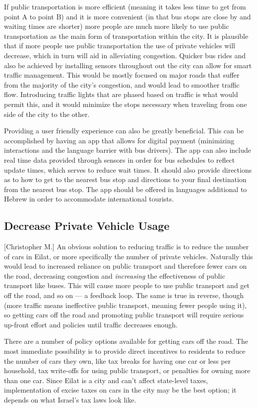 \documentclass[12pt]{article}                               %
\begin{document}
If public transportation is more efficient (meaning it takes less time to get from point A to point B) and it is more convenient (in that bus stops are close by and waiting times are shorter) more people are much more likely to use public transportation as the main form of transportation within the city. It is plausible that if more people use public transportation the use of private vehicles will decrease, which in turn will aid in alleviating congestion. Quicker bus rides and also be achieved by installing sensors throughout out the city can allow for smart traffic management. This would be mostly focused on major roads that suffer from the majority of the city's congestion, and would lead to smoother traffic flow. Introducing traffic lights that are phased based on traffic is what would permit this, and it would minimize the stops necessary when traveling from one side of the city to the other.

Providing a user friendly experience can also be greatly beneficial. This can be accomplished by having an app that allows for digital payment (minimizing interactions and the language barrier with bus drivers). The app can also include real time data provided through sensors in order for bus schedules to reflect update times, which serves to reduce wait times. It should also provide directions as to how to get to the nearest bus stop and directions to your final destination from the nearest bus stop. The app should be offered in languages additional to Hebrew in order to accommodate international tourists. 

\subsection{Decrease Private Vehicle Usage}[Christopher M.]
An obvious solution to reducing traffic is to reduce the number of cars in Eilat, or more specifically the number of private vehicles. Naturally this would lead to increased reliance on public transport and therefore fewer cars on the road, decreasing congestion and \textit{increasing} the effectiveness of public transport like buses. This will cause more people to use public transport and get off the road, and so on --- a feedback loop. The same is true in reverse, though (more traffic means ineffective public transport, meaning fewer people using it), so getting cars off the road and promoting public transport will require serious up-front effort and policies until traffic decreases enough.

There are a number of policy options available for getting cars off the road. The most immediate possibility is to provide direct incentives to residents to reduce the number of cars they own, like tax breaks for having one car or less per household, tax write-offs for using public transport, or penalties for owning more than one car. Since Eilat is a city and can't affect state-level taxes, implementation of excise taxes on cars in the city may be the best option; it depends on what Israel's tax laws look like.
\end{document}
